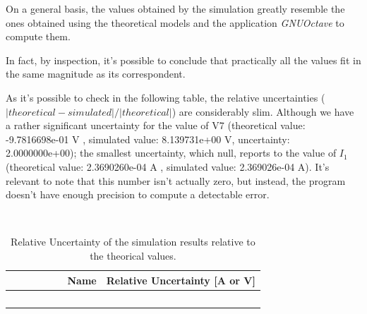 On a general basis, the values obtained by the simulation greatly resemble the ones obtained using the theoretical models and the application \textit{GNUOctave} to compute them.

In fact, by inspection, it's possible to conclude that practically all the values fit in the same magnitude as its correspondent. 

As it's possible to check in the following table, the relative uncertainties ($|theoretical - simulated|/|theoretical|$) are considerably slim.
Although we have a rather significant uncertainty for the value of V7 (theoretical value: -9.7816698e-01 V , simulated value: 8.139731e+00 V, uncertainty: 2.0000000e+00); the smallest uncertainty, which null, reports to the value of $I_1$ (theoretical value: 2.3690260e-04 A , simulated value: 2.369026e-04 A). It's relevant to note that this number isn't actually zero, but instead, the program doesn't have enough precision to compute a detectable error. 

\begin{table}[htb!]
  \centering
  \begin{tabular}{|l|r|}
    \hline    
    {\bf Name} & {\bf Relative Uncertainty [A or V]} \\ \hline
    
  \end{tabular}
  \caption{Relative Uncertainty of the simulation results relative to the theorical values.}
  \label{tab:errors}
\end{table}
